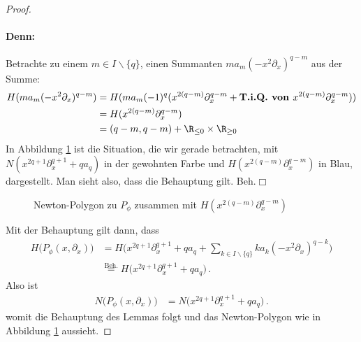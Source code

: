 \begin{proof}
\paragraph{Denn:}
Betrachte zu einem $m\in I\backslash \{q\}$, einen Summanten
$ma_m(-x^2\partial_x)^{q-m}$ aus der Summe:
\begin{align*}
H(ma_m(-x^2\partial_x)^{q-m}) &= H(ma_m(-1)^q(x^{2(q-m)}\partial_x^{q-m}
  +\textbf{T.i.Q. von }x^{2(q-m)}\partial_x^{q-m}))
\\&=H(x^{2(q-m)}\partial_x^{q-m})
\\&=(q-m,q-m) + \R_{\leq 0}\times \R_{\geq 0}
\end{align*}
In Abbildung \ref{fig:Newton-PolygonP_phi} ist die Situation, die wir gerade
betrachten, mit $N(x^{2q + 1}\partial_x^{q + 1} + qa_q)$ in der gewohnten Farbe
und $H(x^{2(q-m)}\partial_x^{q-m})$ in Blau, dargestellt.  Man sieht also, dass
die Behauptung gilt.
\hfill Beh.\ensuremath{\Box}

\begin{figure}[htbp] %
\begin{center}
\end{center}
\caption{Newton-Polygon zu $P_{\phi}$ zusammen mit
  $H(x^{2(q-m)}\partial_x^{q-m})$}
\label{fig:Newton-PolygonP_phi}
\end{figure}
Mit der Behauptung gilt dann, dass
\begin{align*}
H\Big(P_{\phi}(x,\partial_x)\Big)
  &= H\Big(x^{2q + 1}\partial_x^{q + 1} + qa_q
  + \sum_{k\in I\backslash\{q\}}k a_k(-x^2\partial_x)^{q-k} \Big)
\\&\!\!\overset{\text{Beh.}}{=} H\Big(x^{2q + 1}\partial_x^{q + 1} + qa_q \Big)
  \,.
\end{align*}
Also ist
\begin{align*}
N\Big(P_{\phi}(x,\partial_x)\Big)
  &= N\Big(x^{2q + 1}\partial_x^{q + 1} + qa_q \Big) \,.
\end{align*}
womit die Behauptung des Lemmas folgt und das Newton-Polygon wie in Abbildung
\ref{fig:Newton-PolygonP_phi} aussieht.
\end{proof}
